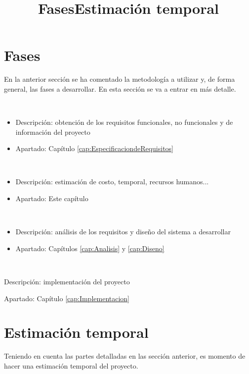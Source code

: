 \title{Fases}
\section{Fases}
En la anterior sección se ha comentado la metodología a utilizar y, de forma general,
las fases a desarrollar. En esta sección se va a entrar en más detalle.

\begin{description}
  \item [Extracción de los requisitos]\hfill \\
  \begin{itemize}
    \item Descripción: obtención de los requisitos funcionales, no funcionales y de información del proyecto
    \item Apartado: Capítulo \ref{cap:EspecificaciondeRequisitos}
  \end{itemize}
  \item [Planificación]\hfill \\
    \begin{itemize}
      \item Descripción: estimación de costo, temporal, recursos humanos...
      \item Apartado: Este capítulo
    \end{itemize}
  \item [Ingeniería]\hfill \\
  \begin{itemize}
    \item Descripción: análisis de los requisitos y diseño del sistema a desarrollar
    \item Apartado: Capítulos \ref{cap:Analisis} y  \ref{cap:Diseno}
  \end{itemize}
  \item [Construcción]\hfill \\
  \item Descripción: implementación del proyecto
  \item Apartado: Capítulo \ref{cap:Implementacion}
\end{description}

\title{Estimación temporal}
\section{Estimación temporal}
Teniendo en cuenta las partes detalladas en las sección anterior, es momento de
hacer una estimación temporal del proyecto.\\


